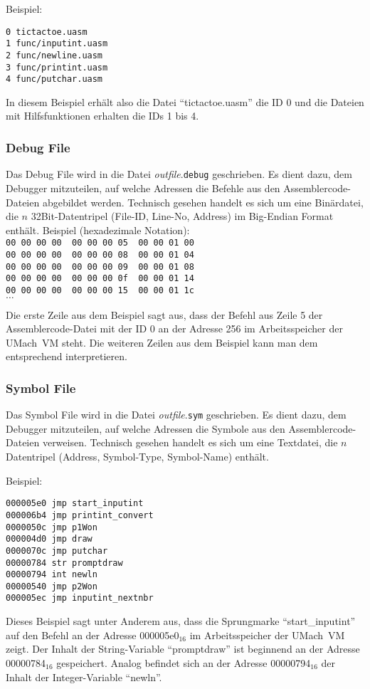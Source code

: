 Beispiel:
\begin{lstlisting}
0 tictactoe.uasm
1 func/inputint.uasm
2 func/newline.uasm
3 func/printint.uasm
4 func/putchar.uasm
\end{lstlisting}

In diesem Beispiel erhält also die Datei ``tictactoe.uasm'' die ID 0 und die
Dateien mit Hilfsfunktionen erhalten die IDs 1 bis 4.

\subsubsection{Debug File}

Das Debug File wird in die Datei \emph{outfile}.\texttt{debug} geschrieben.
Es dient dazu, dem Debugger mitzuteilen, auf welche Adressen die Befehle aus den
Assemblercode-Dateien abgebildet werden. Technisch gesehen handelt es sich um
eine Binärdatei, die $n$ 32Bit-Datentripel (File-ID, Line-No, Address) im
Big-Endian Format enthält.
\newpage
Beispiel (hexadezimale Notation):\\{\small
\texttt{00 00 00 00 \vline\ 00 00 00 05 \vline\ 00 00 01 00}\\
\texttt{00 00 00 00 \vline\ 00 00 00 08 \vline\ 00 00 01 04}\\
\texttt{00 00 00 00 \vline\ 00 00 00 09 \vline\ 00 00 01 08}\\
\texttt{00 00 00 00 \vline\ 00 00 00 0f \vline\ 00 00 01 14}\\
\texttt{00 00 00 00 \vline\ 00 00 00 15 \vline\ 00 00 01 1c}\\
$\hdots$}

Die erste Zeile aus dem Beispiel sagt aus, dass der Befehl aus Zeile 5 der
Assemblercode-Datei mit der ID 0 an der Adresse 256 im Arbeitsspeicher der
UMach~VM steht. Die weiteren Zeilen aus dem Beispiel kann man dem entsprechend
interpretieren.

\subsubsection{Symbol File}

Das Symbol File wird in die Datei \emph{outfile}.\texttt{sym} geschrieben.
Es dient dazu, dem Debugger mitzuteilen, auf welche Adressen die Symbole aus den
Assemblercode-Dateien verweisen. Technisch gesehen handelt es sich um eine
Textdatei, die $n$ Datentripel (Address, Symbol-Type, Symbol-Name) enthält.

Beispiel:
\begin{lstlisting}
000005e0 jmp start_inputint
000006b4 jmp printint_convert
0000050c jmp p1Won
000004d0 jmp draw
0000070c jmp putchar
00000784 str promptdraw
00000794 int newln
00000540 jmp p2Won
000005ec jmp inputint_nextnbr
\end{lstlisting}

Dieses Beispiel sagt unter Anderem aus, dass die Sprungmarke ``start\_inputint''
auf den Befehl an der Adresse 000005e0$_{16}$ im Arbeitsspeicher der UMach~VM
zeigt. Der Inhalt der String-Variable ``promptdraw'' ist beginnend an der Adresse
00000784$_{16}$ gespeichert. Analog befindet sich an der Adresse 00000794$_{16}$
der Inhalt der Integer-Variable ``newln''.
